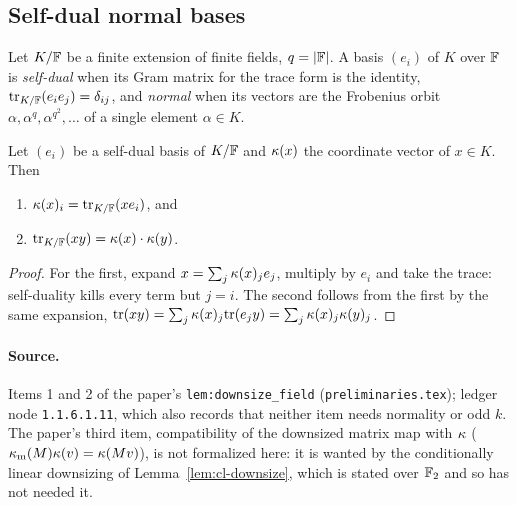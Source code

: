\subsection{Self-dual normal bases}
\label{sec:rr-self-dual-basis}

\effortMedium


\begin{definition}
\label{def:self-dual-basis}
\leanok
Let $K / \mathbb{F}$ be a finite extension of finite fields, $q = \left\vert {\mathbb{F}} \right\vert$. A basis $(e_i)$ of $K$
over $\mathbb{F}$ is \emph{self-dual} when its Gram matrix for the trace form is the identity,
$\mathrm{tr}_{K / \mathbb{F}}(e_i e_j) = \delta_{ij}$, and \emph{normal} when its vectors are the
Frobenius orbit $\alpha, \alpha^q, \alpha^{q^2}, \ldots$ of a single element $\alpha \in K$.
\end{definition}

\begin{lemma}
\label{lem:downsize-field}
\leanok
Let $(e_i)$ be a self-dual basis of $K / \mathbb{F}$ and $\kappa(x)$ the coordinate vector of
$x \in K$. Then
\begin{enumerate}
\item $\kappa(x)_i = \mathrm{tr}_{K/\mathbb{F}}(x e_i)$, and
\item $\mathrm{tr}_{K/\mathbb{F}}(xy) = \kappa(x) \cdot \kappa(y)$.
\end{enumerate}
\end{lemma}

\begin{proof}
\leanok
{}
For the first, expand $x = \sum_j \kappa(x)_j e_j$, multiply by $e_i$ and take the trace:
self-duality kills every term but $j = i$. The second follows from the first by the same
expansion, $\mathrm{tr}(xy) = \sum_j \kappa(x)_j \mathrm{tr}(e_j y) = \sum_j \kappa(x)_j
\kappa(y)_j$.
\end{proof}

\paragraph{Source.} Items 1 and 2 of the paper's \texttt{lem:downsize\_field}
(\texttt{preliminaries.tex}); ledger node \texttt{1.1.6.1.11}, which also records that neither
item needs normality or odd $k$. The paper's third item, compatibility of the downsized matrix
map with $\kappa$ ($\kappa_{\mathrm{m}}(M)\kappa(v) = \kappa(Mv)$), is not
formalized here: it is wanted by the conditionally linear downsizing of
Lemma~\ref{lem:cl-downsize}, which is stated over $\mathbb{F}_2$ and so has not needed it.

